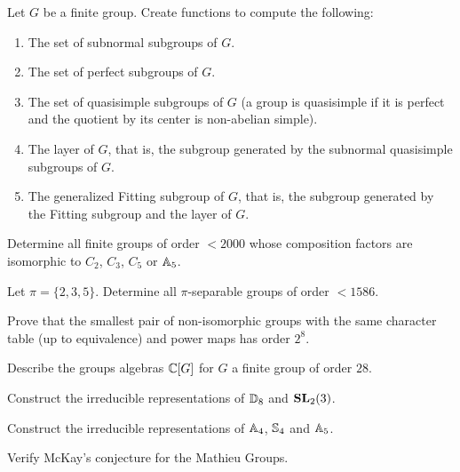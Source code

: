 \begin{prob}
Let $G$ be a finite group.
Create functions to compute the following:
\begin{enumerate}[label=(\alph*)]
    \item The set of subnormal subgroups of $G$.
    \item The set of perfect subgroups of $G$.
    \item The set of quasisimple subgroups of $G$ (a group is quasisimple if it is perfect and the quotient by its center is non-abelian simple).
    \item The layer of $G$, that is, the subgroup generated by the subnormal quasisimple subgroups of $G$.
    \item The generalized Fitting subgroup of $G$, that is, the subgroup generated by the Fitting subgroup and the layer of $G$.
\end{enumerate}
\end{prob}

\begin{prob}
    Determine all finite groups of order $<2000$ whose composition factors are isomorphic to $C_2$, $C_3$, $C_5$ or $\mathbb{A}_5$.
\end{prob}

\begin{prob}
    Let $\pi = \{2,3,5\}$.
    Determine all $\pi$-separable groups of order $<1586$.
\end{prob}


\begin{prob}
    Prove that the smallest pair of non-isomorphic groups
    with the same character table (up to equivalence)
    and power maps 
    has order $2^8$. 
\end{prob}

\begin{prob}
	\label{prob:groupalgebra}
	Describe the groups algebras $\mathbb{C}[G]$ for $G$ a
	finite group of order $28$.
\end{prob}

\begin{prob}
	Construct the irreducible representations of $\mathbb{D}_8$ and $\mathbf{SL}_2(3)$.
\end{prob}

\begin{prob}
	Construct the irreducible representations of 
	$\mathbb{A}_4$, $\mathbb{S}_4$ and $\mathbb{A}_5$.
\end{prob}

\begin{prob}
	\label{prob:McKay:M11}
	Verify McKay's conjecture for the Mathieu Groups.
\end{prob}

